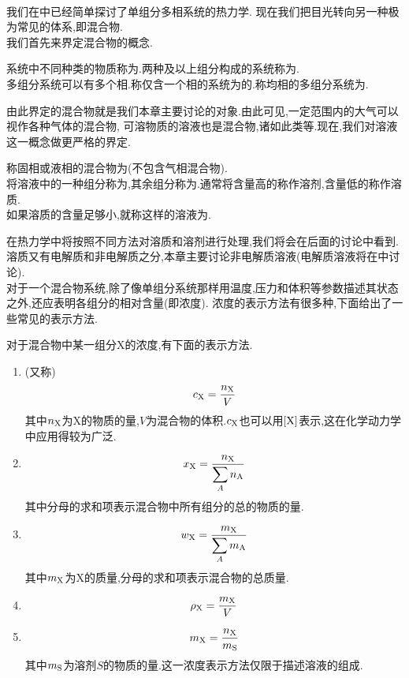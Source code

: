 \documentclass{ctexart}
\begin{document}
\pagestyle{plain}
\noindent{}\vspace{15pt}\\
\indent 我们在中已经简单探讨了单组分多相系统的热力学.%
现在我们把目光转向另一种极为常见的体系,即混合物.\vspace{12pt}\\
\indent 我们首先来界定混合物的概念.
\begin{definition}[4B.1.1 多组分系统与混合物]
    系统中不同种类的物质称为.两种及以上组分构成的系统称为.\\
    多组分系统可以有多个相.称仅含一个相的系统为的.称均相的多组分系统为.
\end{definition}
由此界定的混合物就是我们本章主要讨论的对象.由此可见,一定范围内的大气可以视作各种气体的混合物,%
可溶物质的溶液也是混合物,诸如此类等.现在,我们对溶液这一概念做更严格的界定.
\begin{definition}[4B.1.2 溶液]
    称固相或液相的混合物为(不包含气相混合物).\\
    将溶液中的一种组分称为,其余组分称为.通常将含量高的称作溶剂,含量低的称作溶质.\\
    如果溶质的含量足够小,就称这样的溶液为.
\end{definition}
在热力学中将按照不同方法对溶质和溶剂进行处理,我们将会在后面的讨论中看到.%
溶质又有电解质和非电解质之分,本章主要讨论非电解质溶液(电解质溶液将在中讨论).\vspace{4pt}\\
\indent 对于一个混合物系统,除了像单组分系统那样用温度,压力和体积等参数描述其状态之外,还应表明各组分的相对含量(即浓度).%
浓度的表示方法有很多种,下面给出了一些常见的表示方法.
\begin{definition}[4B.1.3 混合物中组分浓度的表示方法]
    对于混合物中某一组分X的浓度,有下面的表示方法.
    \begin{enumerate}[label=\tbf{\arabic*.}]
        \item {}(又称)
            \[c_{\text X}=\dfrac{n_{\text X}}{V}\]
            其中$n_\text X$为X的物质的量,$V$为混合物的体积.$c_\text X$也可以用$[\text X]$表示,这在化学动力学中应用得较为广泛.
        \item {}
            \[x_\text X=\dfrac{n_\text X}{\displaystyle\sum_{A}n_\text A}\]
            其中分母的求和项表示混合物中所有组分的总的物质的量.
        \item {}
            \[w_\text X=\dfrac{m_\text X}{\displaystyle\sum_{A}m_\text A}\]
            其中$m_\text X$为X的质量,分母的求和项表示混合物的总质量.
        \item {}
            \[\rho_\text X=\dfrac{m_\text X}{V}\]
        \item {}
            \[m_{\text X}=\dfrac{n_\text X}{m_\text S}\]
            其中$m_\text S$为溶剂$S$的物质的量.这一浓度表示方法仅限于描述溶液的组成.
    \end{enumerate}
\end{definition}\vspace{8pt}
\end{document}
